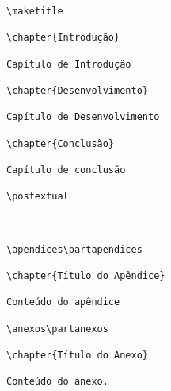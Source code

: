 \begin{Verbatim}[frame=single, fontsize=\scriptsize]
\maketitle

\chapter{Introdução}

Capítulo de Introdução

\chapter{Desenvolvimento}

Capítulo de Desenvolvimento

\chapter{Conclusão}

Capítulo de conclusão

\postextual



\apendices\partapendices

\chapter{Título do Apêndice}

Conteúdo do apêndice

\anexos\partanexos

\chapter{Título do Anexo}

Conteúdo do anexo.


\end{Verbatim}
